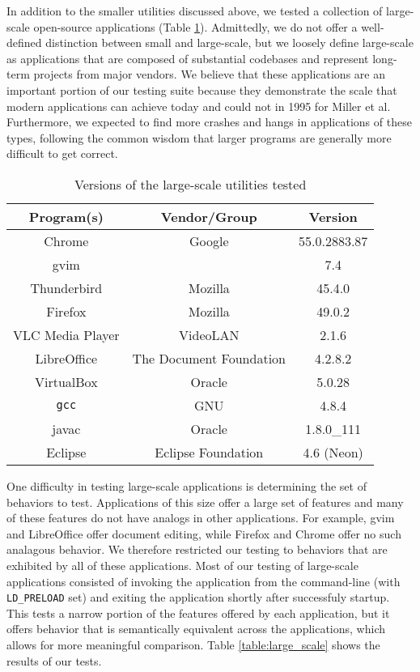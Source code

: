 In addition to the smaller utilities discussed above, we tested a collection of large-scale open-source applications (Table \ref{tab:large_scale_versions}). Admittedly, we do not offer a well-defined distinction between small and large-scale, but we loosely define large-scale as applications that are composed of substantial codebases and represent long-term projects from major vendors. We believe that these applications are an important portion of our testing suite because they demonstrate the scale that modern applications can achieve today and could not in 1995 for Miller et al. Furthermore, we expected to find more crashes and hangs in applications of these types, following the common wisdom that larger programs are generally more difficult to get correct.

\begin{table}[h!]
\begin{center}
\begin{tabular}{ |c|c|c| }
\hline
\multicolumn{1}{|c|}{\textbf{Program(s)}} & \multicolumn{1}{c|}{\textbf{Vendor/Group}} & \multicolumn{1}{c|}{\textbf{Version}} \\
\hline
Chrome & Google & 55.0.2883.87 \\
gvim & & 7.4 \\
Thunderbird & Mozilla & 45.4.0\\
Firefox & Mozilla & 49.0.2 \\
VLC Media Player &VideoLAN & 2.1.6\\
LibreOffice & The Document Foundation & 4.2.8.2\\
VirtualBox & Oracle & 5.0.28\\
\texttt{gcc} & GNU & 4.8.4\\
javac & Oracle & 1.8.0\_111\\
Eclipse & Eclipse Foundation & 4.6 (Neon) \\
\hline
\end{tabular}
\caption{Versions of the large-scale utilities tested}
\label{tab:large_scale_versions}
\end{center}
\end{table}


One difficulty in testing large-scale applications is determining the set of behaviors to test. Applications of this size offer a large set of features and many of these features do not have analogs in other applications. For example, gvim and LibreOffice offer document editing, while Firefox and Chrome offer no such analagous behavior. We therefore restricted our testing to behaviors that are exhibited by all of these applications. Most of our testing of large-scale applications consisted of invoking the application from the command-line (with \texttt{LD\_PRELOAD} set) and exiting the application shortly after successfuly startup. This tests a narrow portion of the features offered by each application, but it offers behavior that is semantically equivalent across the applications, which allows for more meaningful comparison. Table \ref{table:large_scale} shows the results of our tests.

